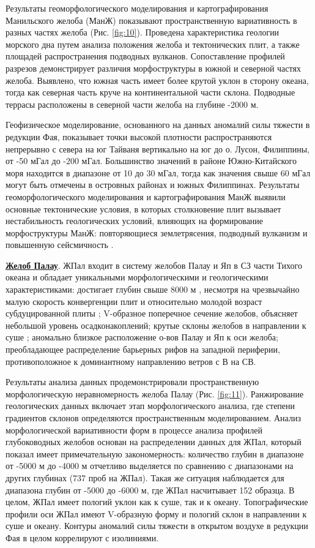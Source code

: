 Результаты геоморфологического моделирования и картографирования Манильского желоба (МанЖ) показывают пространственную вариативность в разных частях желоба (Рис. \ref{fig:10}). Проведена характеристика геологии морского дна путем анализа положения желоба и тектонических плит, а также площадей распространения подводных вулканов. Сопоставление профилей разрезов демонстрирует различия морфоструктуры в южной и северной частях желоба. Выявлено, что южная часть имеет более крутой уклон в сторону океана, тогда как северная часть круче на континентальной части склона. Подводные террасы расположены в северной части желоба на глубине -2000 м.

Геофизическое моделирование, основанного на данных аномалий силы тяжести в редукции Фая, показывает точки высокой плотности распространяются непрерывно с севера на юг Тайваня вертикально на юг до о. Лусон, Филиппины, от -50 мГал до -200 мГал. Большинство значений в районе Южно-Китайского моря находится в диапазоне от 10 до 30 мГал, тогда как значения свыше 60 мГал могут быть отмечены в островных районах и южных Филиппинах. Результаты геоморфологического моделирования и картографирования МанЖ выявили основные тектонические условия, в которых столкновение плит вызывает нестабильность геологических условий, влияющих на формирование морфоструктуры МанЖ: повторяющиеся землетрясения, подводный вулканизм и повышенную сейсмичность \cite{Андреева2013}.

\underline{\textbf{Желоб Палау}}. 
ЖПал входит в систему желобов Палау и Яп в СЗ части Тихого океана и обладает уникальными морфологическими и геологическими характеристиками: достигает глубин свыше 8000 м \cite{Kobayashietal1997}, несмотря на чрезвычайно малую скорость конвергенции плит и относительно молодой возраст субдуцированной плиты \cite{Caoetal2014}; V-образное поперечное сечение желобов, объясняет небольшой уровень осадконакоплений; крутые склоны желобов в направлении к суше \cite{Tsuboietal2014}; аномально близкое расположение о-вов Палау и Яп к оси желоба; преобладающее распределение барьерных рифов на западной периферии, противоположное к доминантному направлению ветров с В на СВ.

Результаты анализа данных продемонстрировали пространственную морфологическую неравномерность желоба Палау (Рис. \ref{fig:11}). Ранжирование геологических данных включает этап морфологического анализа, где степени градиентов склонов определяются пространственным моделированием. Анализ морфологической вариативности форм в процессе анализа профилей глубоководных желобов основан на распределении данных для ЖПал, который показал имеет примечательную закономерность: количество глубин в диапазоне от -5000 м до -4000 м отчетливо выделяется по сравнению с диапазонами на других глубинах (737 проб на ЖПал). Такая же ситуация наблюдается для диапазона глубин от -5000 до -6000 м, где ЖПал насчитывает 152 образца. В целом, ЖПал имеет пологий уклон как к суше, так и к океану. Топографические профили оси ЖПал имеют V-образную форму и пологий склон в направлении к суше и океану. Контуры аномалий силы тяжести в открытом воздухе в редукции Фая в целом коррелируют с изолиниями. 

